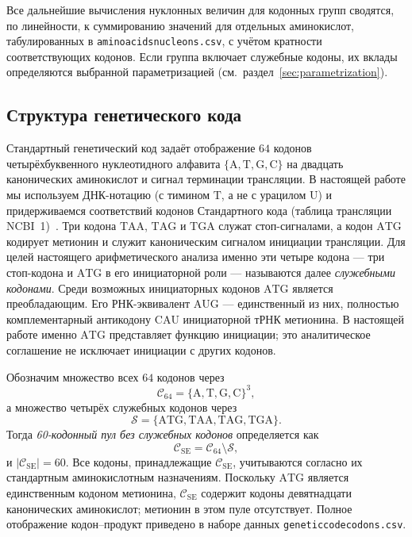 \documentclass[11pt,a4paper]{article}
\renewcommand{\_}{\origunderscore\allowbreak}
\begin{document}
Все дальнейшие вычисления нуклонных величин для кодонных групп
сводятся, по линейности, к суммированию значений для отдельных
аминокислот, табулированных в
\texttt{amino\_acids\_nucleons.csv}, с учётом кратности
соответствующих кодонов. Если группа включает служебные кодоны, их
вклады определяются выбранной параметризацией
(см.\ раздел~\ref{sec:parametrization}).

\subsection{Структура генетического кода}
\label{sec:genetic-code}

Стандартный генетический код задаёт отображение $64$ кодонов
четырёхбуквенного нуклеотидного алфавита
$\{\mathrm{A}, \mathrm{T}, \mathrm{G}, \mathrm{C}\}$ на двадцать
канонических аминокислот и сигнал терминации трансляции. В настоящей
работе мы используем ДНК-нотацию (с тимином $\mathrm{T}$, а не с
урацилом $\mathrm{U}$) и придерживаемся соответствий кодонов
Стандартного кода (таблица трансляции
NCBI~1)~\cite{ncbi2024geneticcodes}. Три кодона $\mathrm{TAA}$,
$\mathrm{TAG}$ и $\mathrm{TGA}$ служат стоп-сигналами, а кодон
$\mathrm{ATG}$ кодирует метионин и служит каноническим сигналом
инициации трансляции. Для целей настоящего арифметического анализа
именно эти четыре кодона --- три стоп-кодона и $\mathrm{ATG}$ в его
инициаторной роли --- называются далее \emph{служебными кодонами}.
Среди возможных инициаторных кодонов $\mathrm{ATG}$ является
преобладающим. Его РНК-эквивалент $\mathrm{AUG}$ --- единственный
из них, полностью комплементарный антикодону $\mathrm{CAU}$
инициаторной тРНК метионина. В настоящей работе именно
$\mathrm{ATG}$ представляет функцию инициации; это аналитическое
соглашение не исключает инициации с других кодонов.

Обозначим множество всех $64$ кодонов через
\[
\mathcal{C}_{64}
=
\{\mathrm{A},\mathrm{T},\mathrm{G},\mathrm{C}\}^{3},
\]
а множество четырёх служебных кодонов через
\[
\mathcal{S}
=
\{\mathrm{ATG},\mathrm{TAA},\mathrm{TAG},\mathrm{TGA}\}.
\]
Тогда \emph{60-кодонный пул без служебных кодонов} определяется как
\[
\mathcal{C}_{\mathrm{SE}}
=
\mathcal{C}_{64}\setminus\mathcal{S},
\]
и $|\mathcal{C}_{\mathrm{SE}}|=60$. Все кодоны, принадлежащие
$\mathcal{C}_{\mathrm{SE}}$, учитываются согласно их стандартным
аминокислотным назначениям. Поскольку $\mathrm{ATG}$ является единственным кодоном метионина,
$\mathcal{C}_{\mathrm{SE}}$ содержит кодоны девятнадцати канонических
аминокислот; метионин в этом пуле отсутствует. Полное отображение кодон--продукт
приведено в наборе данных
\texttt{genetic\_code\_codons.csv}.
\end{document}

